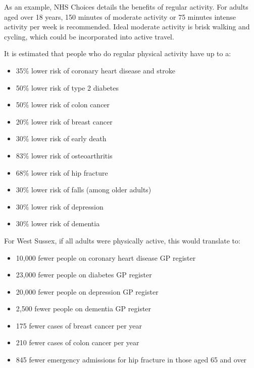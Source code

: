 \begin{tcolorbox}[width=\linewidth, title={A Health Improvement Challenge}, colback={boxcolour}]
As an example, NHS Choices details the benefits of regular activity. For adults aged over 18 years, 150 minutes of moderate activity or 75 minutes intense activity per week is recommended. Ideal moderate activity is brisk walking and cycling, which could be incorporated into active travel.

It is estimated that people who do regular physical activity have up to a:

\begin{itemize}[noitemsep]
    \item 35\% lower risk of coronary heart disease and stroke
    \item 50\% lower risk of type 2 diabetes
    \item 50\% lower risk of colon cancer
    \item 20\% lower risk of breast cancer
    \item 30\% lower risk of early death
    \item 83\% lower risk of osteoarthritis
    \item 68\% lower risk of hip fracture
    \item 30\% lower risk of falls (among older adults)
    \item 30\% lower risk of depression
    \item 30\% lower risk of dementia
\end{itemize}

For West Sussex, if all adults were physically active, this would translate to:

\begin{itemize}[noitemsep]
    \item 10,000 fewer people on coronary heart disease GP register
    \item 23,000 fewer people on diabetes GP register
    \item 20,000 fewer people on depression GP register
    \item 2,500 fewer people on dementia GP register
    \item 175 fewer cases of breast cancer per year
    \item 210 fewer cases of colon cancer per year
    \item 845 fewer emergency admissions for hip fracture in those aged 65 and over
\end{itemize}
\end{tcolorbox}

